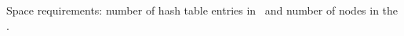 \label{fig:kblpp-space} Space requirements: number of hash table entries in \blpp\ and number of nodes in the \ksf.

